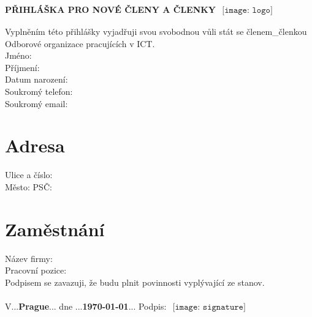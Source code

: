 \documentclass[a4]{article}
\newcommand{\longunderline}[1]{\textbf{\uline{#1\hfill\mbox{}}}}
\begin{document}
	
	\LARGE
	

	\textbf{PŘIHLÁŠKA PRO NOVÉ ČLENY A ČLENKY} $ \begin{array}{l}\texttt{[image: logo]}\end{array} $	 \\
	
	\large
	
	Vyplněním této přihlášky vyjadřuji svou svobodnou vůli stát se členem\_členkou
	Odborové organizace pracujících v ICT.\\
	
	Jméno: \longunderline{\Name}\\
	
	Příjmení: \longunderline{\Surname}\\
	
	Datum narození: \longunderline{\DateOfBirth}\\
	
	Soukromý telefon: \longunderline{\Phone}\\
	
	Soukromý email: \longunderline{\Email}\\
	
	\section{Adresa}
	
	Ulice a číslo: \longunderline{\Address}\\
	
	Město: \longunderline{\City} PSČ: \longunderline{\Zipcode} \\
	
	\section{Zaměstnání}
	
	Název firmy: \longunderline{\Company}\\
	
	Pracovní pozice: \longunderline{\Position}\\
	
	Podpisem se zavazuji, že budu plnit povinnosti vyplývající ze stanov.\\\\
	
	V...\textbf{Prague}... dne ...\textbf{\today}... \hspace{50mm} Podpis: $ \begin{array}{l}\texttt{[image: signature]}\end{array} $  \\
	
\end{document}
